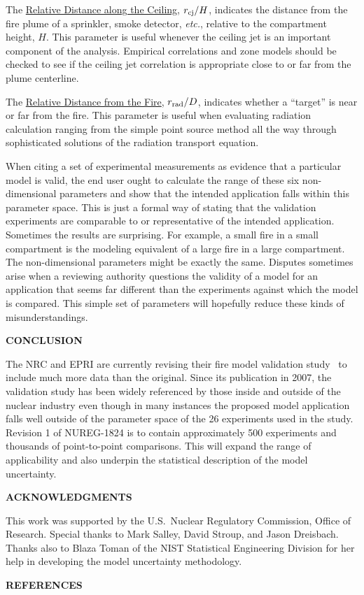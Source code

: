 \documentclass[fleqn,b5paper]{article}
\begin{document}
The \underline{Relative Distance along the Ceiling}, $r_{\rm cj}/H$, indicates the distance from the fire plume of a sprinkler, smoke detector, {\em etc.}, relative to the compartment height, $H$. This parameter is useful whenever the ceiling jet is an important component of the analysis. Empirical correlations and zone models should be checked to see if the ceiling jet correlation is appropriate close to or far from the plume centerline.

The \underline{Relative Distance from the Fire}, $r_{\rm rad}/D$, indicates whether a ``target'' is near or far from the fire. This parameter is useful when evaluating radiation calculation ranging from the simple point source method all the way through sophisticated solutions of the radiation transport equation.

When citing a set of experimental measurements as evidence that a particular model is valid, the end user ought to calculate the range of these six non-dimensional parameters and show that the intended application falls within this parameter space. This is just a formal way of stating that the validation experiments are comparable to or representative of the intended application. Sometimes the results are surprising. For example, a small fire in a small compartment is the modeling equivalent of a large fire in a large compartment. The non-dimensional parameters might be exactly the same. Disputes sometimes arise when a reviewing authority questions the validity of a model for an application that seems far different than the experiments against which the model is compared. This simple set of parameters will hopefully reduce these kinds of misunderstandings.


\vspace{\parskip}
{\bf CONCLUSION}

The NRC and EPRI are currently revising their fire model validation study~\cite{NUREG_1824} to include much more data than the original. Since its publication in 2007, the validation study has been widely referenced by those inside and outside of the nuclear industry even though in many instances the proposed model application falls well outside of the parameter space of the 26 experiments used in the study. Revision 1 of NUREG-1824 is to contain approximately 500 experiments and thousands of point-to-point comparisons. This will expand the range of applicability and also underpin the statistical description of the model uncertainty. 

\vspace{\parskip}
{\bf ACKNOWLEDGMENTS}

This work was supported by the U.S.~Nuclear Regulatory Commission, Office of Research. Special thanks to Mark Salley, David Stroup, and Jason Dreisbach. Thanks also to Blaza Toman of the NIST Statistical Engineering Division for her help in developing the model uncertainty methodology.

\vspace{\parskip}
{\bf REFERENCES}
\vspace{-0.5in}

\renewcommand{\refname}{}

\end{document}

